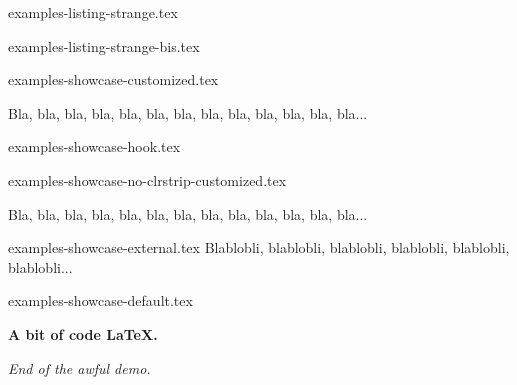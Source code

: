 \begin{filecontents*}[overwrite]{examples-listing-strange.tex}
\begin{tdoclatex}
\end{tdoclatex}
\end{filecontents*}


\begin{filecontents*}[overwrite]{examples-listing-strange-bis.tex}
\begin{tdoclatex}
\end{tdoclatex}
\end{filecontents*}


\begin{filecontents*}[overwrite]{examples-showcase-customized.tex}
\begin{tdocshowcase}[before = My beginning,
                     after  = My end,
                     color  = red]
    Bla, bla, bla, bla, bla, bla, bla, bla, bla, bla, bla, bla, bla...
\end{tdocshowcase}
\end{filecontents*}


\begin{filecontents*}[overwrite]{examples-showcase-hook.tex}
\begin{tdocshowcase}
\end{tdocshowcase}
\end{filecontents*}


\begin{filecontents*}[overwrite]{examples-showcase-no-clrstrip-customized.tex}
\begin{tdocshowcase}[nostripe,
                     before = My beginning,
                     after  = My end,
                     color  = green]
    Bla, bla, bla, bla, bla, bla, bla, bla, bla, bla, bla, bla, bla...
\end{tdocshowcase}
\end{filecontents*}


\begin{filecontents*}[overwrite]{examples-showcase-external.tex}
Blablobli, blablobli, blablobli, blablobli, blablobli, blablobli...
\end{filecontents*}


\begin{filecontents*}[overwrite]{examples-showcase-default.tex}
\begin{tdocshowcase}
    \bfseries A bit of code \LaTeX.

    \bigskip

    \emph{\large End of the awful demo.}
\end{tdocshowcase}
\end{filecontents*}



